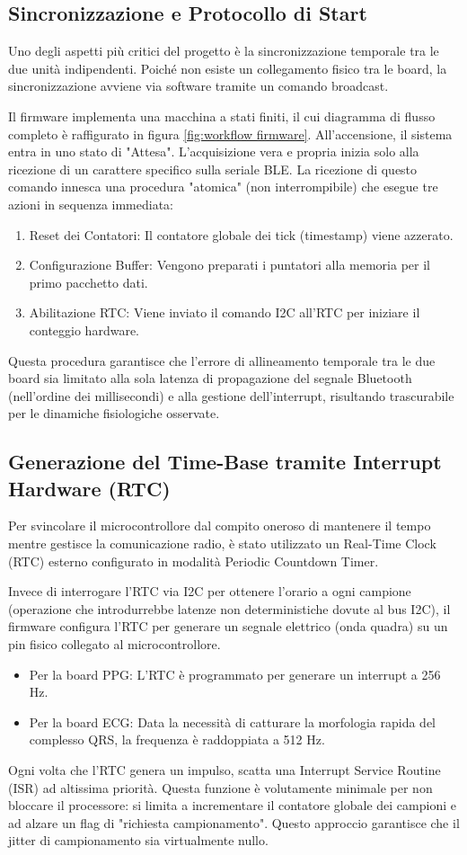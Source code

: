 \documentclass[11pt,a4paper]{article}
\begin{document}
\subsection{Sincronizzazione e Protocollo di Start}
Uno degli aspetti più critici del progetto è la sincronizzazione temporale tra le due unità indipendenti. Poiché non esiste un collegamento fisico tra le board, la sincronizzazione avviene via software tramite un comando broadcast.

Il firmware implementa una macchina a stati finiti, il cui diagramma di flusso completo è raffigurato in figura \ref{fig:workflow firmware}. All'accensione, il sistema entra in uno stato di "Attesa". L'acquisizione vera e propria inizia solo alla ricezione di un carattere specifico sulla seriale BLE. La ricezione di questo comando innesca una procedura "atomica" (non interrompibile) che esegue tre azioni in sequenza immediata:
\begin{enumerate}
  \item Reset dei Contatori: Il contatore globale dei tick (timestamp) viene azzerato.
  \item Configurazione Buffer: Vengono preparati i puntatori alla memoria per il primo pacchetto dati.
  \item Abilitazione RTC: Viene inviato il comando I2C all'RTC per iniziare il conteggio hardware.
\end{enumerate}

Questa procedura garantisce che l'errore di allineamento temporale tra le due board sia limitato alla sola latenza di propagazione del segnale Bluetooth (nell'ordine dei millisecondi) e alla gestione dell'interrupt, risultando trascurabile per le dinamiche fisiologiche osservate.

\subsection{Generazione del Time-Base tramite Interrupt Hardware (RTC)}
Per svincolare il microcontrollore dal compito oneroso di mantenere il tempo mentre gestisce la comunicazione radio, è stato utilizzato un Real-Time Clock (RTC) esterno configurato in modalità Periodic Countdown Timer.

Invece di interrogare l'RTC via I2C per ottenere l'orario a ogni campione (operazione che introdurrebbe latenze non deterministiche dovute al bus I2C), il firmware configura l'RTC per generare un segnale elettrico (onda quadra) su un pin fisico collegato al microcontrollore.
\begin{itemize}
  \item Per la board PPG: L'RTC è programmato per generare un interrupt a 256 Hz.
  \item Per la board ECG: Data la necessità di catturare la morfologia rapida del complesso QRS, la frequenza è raddoppiata a 512 Hz.
\end{itemize}
Ogni volta che l'RTC genera un impulso, scatta una Interrupt Service Routine (ISR) ad altissima priorità. Questa funzione è volutamente minimale per non bloccare il processore: si limita a incrementare il contatore globale dei campioni e ad alzare un flag di "richiesta campionamento". Questo approccio garantisce che il jitter di campionamento sia virtualmente nullo.
\end{document}
